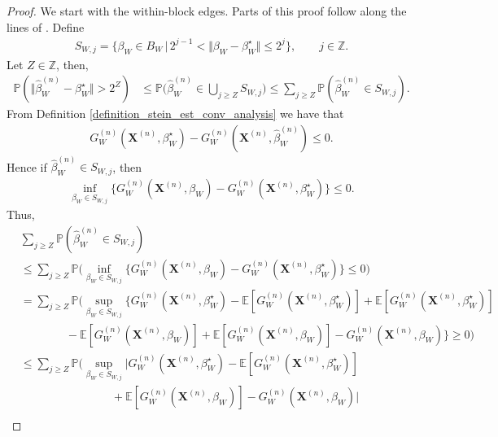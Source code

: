 \documentclass{article}
\begin{document}
\begin{proof}
    We start with the within-block edges. Parts of this proof follow along the lines of \cite[Theorem 3.2.5]{vandervaart2023weak}. Define 
    \begin{align*}
        S_{W,j}= \{ \beta_W \in B_W \, \vert \, 2^{j-1} < \Vert \beta_W - \beta_W^{\star} \Vert \leq 2^j \} , \qquad j \in \mathbb{Z}.
    \end{align*}
    Let $Z \in \mathbb{Z}$, then,
    \begin{align*}
        \mathbb{P}(\Vert \hat{\beta}_W^{(n)} - \beta_W^{\star} \Vert > 2^Z  ) &\leq \mathbb{P} \bigg( \hat{\beta}_W^{(n)} \in \bigcup_{j \geq Z} S_{W,j}  \bigg)  \leq \sum_{j\geq Z} \mathbb{P}(\hat{\beta}_W^{(n)} \in S_{W,j} ).
    \end{align*}
    From Definition \ref{definition_stein_est_conv_analysis} we have that 
    \begin{align*}
        G_W^{(n)}(\mathbf{X}^{(n)},\beta_W^{\star}) - G_W^{(n)}(\mathbf{X}^{(n)},{\hat{\beta}}_W^{(n)} ) \leq 0.
    \end{align*}
    Hence if ${\hat{\beta}}_W^{(n)}  \in S_{W,j}$, then 
    \begin{align*}
        \inf_{\beta_W \in S_{W,j}} \big\{ G_W^{(n)}(\mathbf{X}^{(n)},\beta_W) - G_W^{(n)}(\mathbf{X}^{(n)},\beta_W^{\star} ) \big\} \leq 0  .
    \end{align*}
    Thus, 
    \begin{align*}
        &\sum_{j\geq Z} \mathbb{P}(\hat{\beta}_W^{(n)} \in S_{W,j} )
        \\  & \leq  \sum_{j\geq Z} \mathbb{P}\bigg( \inf_{\beta_W \in S_{W,j}} \big\{ G_W^{(n)}(\mathbf{X}^{(n)},\beta_W) - G_W^{(n)}(\mathbf{X}^{(n)},\beta_W^{\star} ) \big\} \leq 0  \bigg) \\
        & =  \sum_{j\geq Z} \mathbb{P}\bigg( \sup_{\beta_W \in S_{W,j}} \big\{ G_W^{(n)}(\mathbf{X}^{(n)},\beta_W^{\star}) - \mathbb{E}[ G_W^{(n)}(\mathbf{X}^{(n)},\beta_W^{\star})] + \mathbb{E}[G_W^{(n)}(\mathbf{X}^{(n)},\beta_W^{\star})] \\
        & \qquad \qquad - \mathbb{E}[G_W^{(n)}(\mathbf{X}^{(n)},\beta_W)] + \mathbb{E}[G_W^{(n)}(\mathbf{X}^{(n)},\beta_W)]- G_W^{(n)}(\mathbf{X}^{(n)},\beta_W)  \big\} \geq 0  \bigg) \\
        &\leq \sum_{j\geq Z} \mathbb{P}\bigg( \sup_{\beta_W \in S_{W,j}} \big\vert G_W^{(n)}(\mathbf{X}^{(n)},\beta_W^{\star}) - \mathbb{E}[ G_W^{(n)}(\mathbf{X}^{(n)},\beta_W^{\star})] \\
        &\qquad \qquad \qquad \qquad + \mathbb{E}[G_W^{(n)}(\mathbf{X}^{(n)},\beta_W)] -G_W^{(n)}(\mathbf{X}^{(n)},\beta_W)\big\vert \\

\end{align*}
\end{proof}
\end{document}
